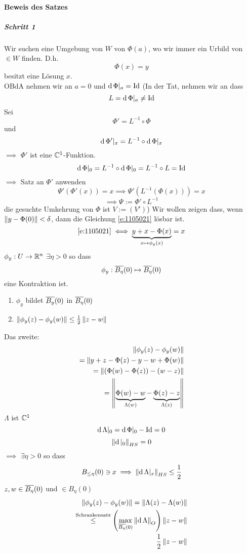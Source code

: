 \paragraph{Beweis des Satzes}
\subparagraph{Schritt 1}
Wir suchen eine Umgebung von $W$ von $\Phi(a)$, wo wir immer ein Urbild von $\in W$ finden. D.h. 
\begin{equation}
  \label{e:1105021}
  \Phi(x)=y
\end{equation}
besitzt eine Lösung $x$.\\
OBdA nehmen wir an $a=0$ und $\operatorname{d}\Phi|_a=\operatorname{Id}$ %
(In der Tat, nehmen wir an dass
\[L=\operatorname{d}\Phi|_a\neq \operatorname{Id}\]
Sei 
\[\Phi'=L^{-1}\circ \Phi\] und 
\[\operatorname{d}\Phi'|_x=L^{-1}\circ \operatorname{d}\Phi|_x\]
$\implies$ $\Phi'$ ist eine $\mathbb{C}^1$-Funktion.
\[\operatorname{d}\Phi|_0=L^{-1}\circ\operatorname{d}\Phi|_0=L^{-1}\circ L=\operatorname{Id}\]
$\implies$ Satz an $\Phi'$ anwenden
\[\Psi'(\Phi'(x))=x\implies \Psi'(L^{-1}(\Phi(x)))=x\]
\[\implies\Psi:=\Phi'\circ L^{-1}\]
die gesuchte Umkehrung von $\Phi$ ist $V:=(V')$)
Wir wollen zeigen dass, wenn $\left\| y-\Phi(0) \right\|<\delta$, dann die Gleichung \ref{e:1105021} lösbar ist.
\[\ref{e:1105021}\iff \underbrace{y+x-\Phi(x)}_{x\mapsto \phi_y(x)}=x\]
$\phi_y:U\rightarrow\mathbb{R}^n$ $\exists \eta>0$ so dass
\[\phi_y:\overline{B_\eta}(0)\mapsto \overline{B_\eta}(0)\]
eine Kontraktion ist.
\begin{enumerate}
  \item $\phi_y$ bildet $\overline{B_y}(0)$ in $\overline{B_\eta}(0)$
  \item $\left\| \phi_y(z)-\phi_y(w) \right\|\leq\frac{1}{2}\left\| z-w \right\|$
\end{enumerate}
Das zweite:
\begin{eqnarray*}
  \left\| \phi_y(z)-\phi_y(w) \right\|\\
  =\left\| y+z-\Phi(z)-y-w+\Phi(w) \right\|\\
  =\left\| (\Phi(w)-\Phi(z))-(w-z) \right\|\\
  =\left\| \underbrace{\Phi(w)-w}_{\Lambda(w)}-\underbrace{\Phi(z)-z}_{\Lambda(z)} \right\|
\end{eqnarray*}
$\Lambda$ ist $\mathbb{C}^1$
\[\operatorname{d}\Lambda|_0=\operatorname{d}\Phi|_0-\operatorname{Id}=0\]
\[\left\| \operatorname{d}|_0 \right\|_{HS}=0\]
$\implies$ $\exists \eta>0$ so dass
\[B_{\leq \eta}(0)\ni x\implies\left\| \operatorname{d}\Lambda|_x \right\|_{HS}\leq\frac{1}{2}\]
$z,w\in \overline{B_\eta}(0)$ und $\in B_\eta(0)$
\begin{eqnarray*}
  \left\| \phi_y(z)-\phi_y(w) \right\|=\left\| \Lambda(z)-\Lambda(w) \right\|\\
  \stackrel{\text{Schrankensatz}}{\leq}\left( \max_{\overline{B_\eta}(0)}\left\| \operatorname{d}\Lambda \right\|_O \right)\left\| z-w \right\|\\
  \frac{1}{2}\left\| z-w \right\|
\end{eqnarray*}
